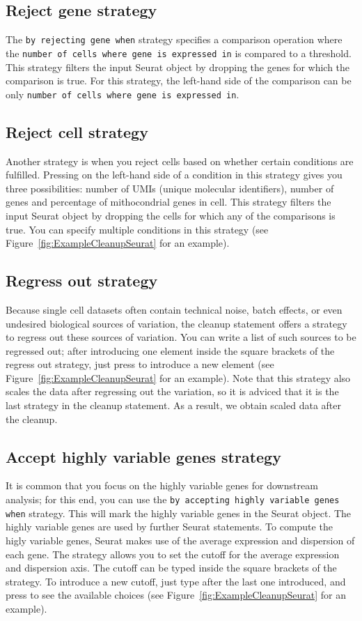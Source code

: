 \subsection{Reject gene strategy}
The \texttt{by rejecting gene when} strategy specifies a comparison operation where the
\texttt{number of cells where gene is expressed in} is compared to a threshold.
This strategy filters the input Seurat object by dropping the genes for which
the comparison is true. For this strategy, the left-hand side of the comparison can be
only \texttt{number of cells where gene is expressed in}.

\subsection{Reject cell strategy}
Another strategy is when you reject cells based on whether certain conditions are fulfilled.
Pressing \keys{\ctrl+\space} on the left-hand side of a condition in this strategy gives you
three possibilities: number of UMIs (unique molecular identifiers), number of genes and
percentage of mithocondrial genes in cell. This strategy filters the input Seurat object
by dropping the cells for which any of the comparisons is true. You can specify multiple
conditions in this strategy (see Figure~\ref{fig:ExampleCleanupSeurat} for an example).

\subsection{Regress out strategy}
Because single cell datasets often contain technical noise, batch effects, or even undesired
biological sources of variation, the cleanup statement offers a strategy to regress out
these sources of variation. You can write a list of such sources to be regressed out;
after introducing one element inside the square brackets of the regress out strategy, just
press \keys{\return} to introduce a new element (see Figure~\ref{fig:ExampleCleanupSeurat}
for an example). Note that this strategy also scales the data after regressing out the
variation, so it is adviced that it is the last strategy in the cleanup statement. As a result,
we obtain scaled data after the cleanup.

\subsection{Accept highly variable genes strategy}
It is common that you focus on the highly variable genes for downstream analysis; for this end,
you can use the \texttt{by accepting highly variable genes when} strategy. This will mark
the highly variable genes in the Seurat object. The highly variable genes are used by further Seurat
statements. To compute the higly variable genes, Seurat makes use of the average expression
and dispersion of each gene. The strategy allows you to set the cutoff for the average expression
and dispersion axis. The cutoff can be typed inside the square brackets of the strategy. To
introduce a new cutoff, just type \keys{\return} after the last one introduced, and press
\keys{\ctrl+\space} to see the available choices (see Figure~\ref{fig:ExampleCleanupSeurat}
for an example).

